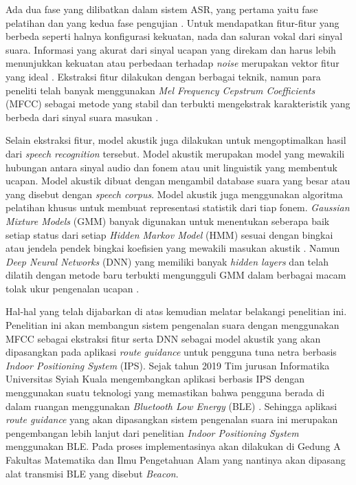 \par Ada dua fase yang dilibatkan dalam sistem ASR, yang pertama yaitu fase pelatihan dan yang kedua fase pengujian \citep{ouisaadane2020}. Untuk mendapatkan fitur-fitur yang berbeda seperti halnya konfigurasi kekuatan, nada dan saluran vokal dari sinyal suara. Informasi yang akurat dari sinyal ucapan yang direkam dan harus lebih menunjukkan kekuatan atau perbedaan terhadap \textit{noise} merupakan vektor fitur yang ideal \citep{dua2018}. Ekstraksi fitur dilakukan dengan berbagai teknik, namun para peneliti telah banyak menggunakan \textit{Mel Frequency Cepstrum Coefficients} (MFCC) sebagai metode yang stabil dan terbukti mengekstrak karakteristik yang berbeda dari sinyal suara masukan \citep{dua2018}. 

\par Selain ekstraksi fitur, model akustik juga dilakukan untuk mengoptimalkan hasil dari \textit{speech recognition} tersebut. Model akustik merupakan model yang mewakili hubungan antara sinyal audio dan fonem atau unit linguistik yang membentuk ucapan. Model akustik dibuat dengan mengambil database suara yang besar atau yang disebut dengan \textit{speech corpus}. Model akustik juga menggunakan algoritma pelatihan khusus untuk membuat representasi statistik dari tiap fonem. \textit{Gaussian Mixture Models} (GMM) banyak digunakan untuk menentukan seberapa baik setiap status dari setiap \textit{Hidden Markov Model} (HMM) sesuai dengan bingkai atau jendela pendek bingkai koefisien yang mewakili masukan akustik \citep{hinton2012}. Namun \textit{Deep Neural Networks} (DNN) yang memiliki banyak \textit{hidden layers} dan telah dilatih dengan metode baru terbukti mengungguli GMM dalam berbagai macam tolak ukur pengenalan ucapan \citep{hinton2012}.

\par  Hal-hal yang telah dijabarkan di atas kemudian melatar belakangi penelitian ini. Penelitian ini akan membangun sistem pengenalan suara dengan menggunakan MFCC sebagai ekstraksi fitur serta DNN sebagai model akustik yang akan dipasangkan pada aplikasi \textit{route guidance} untuk pengguna tuna netra berbasis \textit{Indoor Positioning System} (IPS). Sejak tahun 2019 Tim jurusan Informatika Universitas Syiah Kuala mengembangkan aplikasi berbasis IPS dengan menggunakan suatu teknologi yang memastikan bahwa pengguna berada di dalam ruangan menggunakan \textit{Bluetooth Low Energy} (BLE) \citep{puspitasari2020}. Sehingga aplikasi \textit{route guidance} yang akan dipasangkan sistem pengenalan suara ini merupakan pengembangan lebih lanjut dari penelitian \textit{Indoor Positioning System} menggunakan BLE. Pada proses implementasinya akan dilakukan di Gedung A Fakultas Matematika dan Ilmu Pengetahuan Alam yang nantinya akan dipasang alat transmisi BLE yang disebut \textit{Beacon}.

